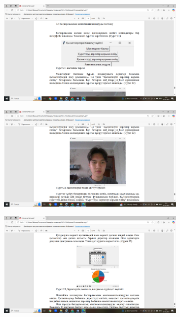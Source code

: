 \begin{figure}[H]
	\centering
	\includegraphics[width=0.8\textwidth]{media/ict2/image160}
	\caption*{}
\end{figure}

\begin{figure}[H]
	\centering
	\includegraphics[width=0.8\textwidth]{media/ict2/image161}
	\caption*{}
\end{figure}

\begin{figure}[H]
	\centering
	\includegraphics[width=0.8\textwidth]{media/ict2/image162}
	\caption*{}
\end{figure}

